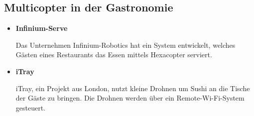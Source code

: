   \subsection*{Multicopter in der Gastronomie}
  \begin{itemize}
      \item \textbf{Infinium-Serve}

      Das Unternehmen {Infinium-Robotics\cite{infiniumserve}} hat ein System entwickelt, welches Gästen eines Restaurants
      das Essen mittels Hexacopter serviert.

      \item \textbf{iTray}

      {iTray\cite{itray}}, ein Projekt aus London, nutzt kleine Drohnen um Sushi an die Tische der Gäste zu bringen.
      Die Drohnen werden über ein Remote-Wi-Fi-System gesteuert.

  \end{itemize}

